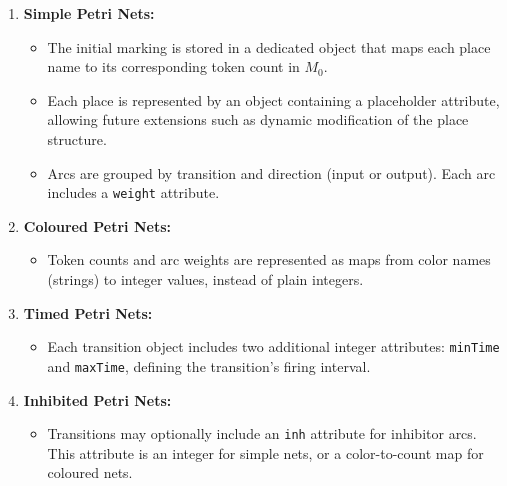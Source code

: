 \documentclass[12pt]{article}
\begin{document}
        \begin{enumerate}
            \item \textbf{Simple Petri Nets:}
            \begin{itemize}
                \item The initial marking is stored in a dedicated object that maps each place name to its corresponding token count in $M_0$.
                \item Each place is represented by an object containing a placeholder attribute, allowing future extensions such as dynamic modification of the place structure.
                \item Arcs are grouped by transition and direction (input or output). Each arc includes a \texttt{weight} attribute.
            \end{itemize}
        
            \item \textbf{Coloured Petri Nets:}
            \begin{itemize}
                \item Token counts and arc weights are represented as maps from color names (strings) to integer values, instead of plain integers.
            \end{itemize}
        
            \item \textbf{Timed Petri Nets:}
            \begin{itemize}
                \item Each transition object includes two additional integer attributes: \texttt{minTime} and \texttt{maxTime}, defining the transition's firing interval.
            \end{itemize}
        
            \item \textbf{Inhibited Petri Nets:}
            \begin{itemize}
                \item Transitions may optionally include an \texttt{inh} attribute for inhibitor arcs. This attribute is an integer for simple nets, or a color-to-count map for coloured nets.
            \end{itemize}
        

\end{enumerate}
\end{document}
